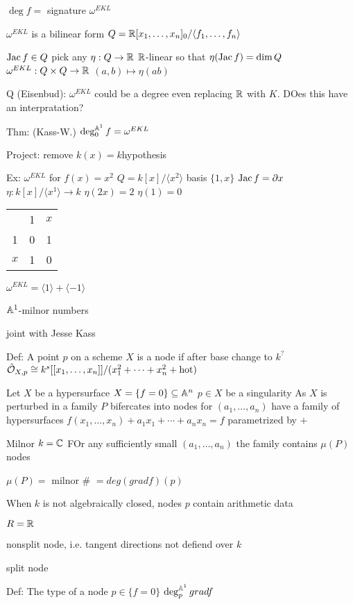 $\deg f=$ signature $\omega^{EKL}$

$\omega^{EKL}$ is a bilinear form
$Q= \mathbb{R}[x_1,\ldots,x_n]_0/\langle f_1,\ldots,f_n \rangle$

$\operatorname{Jac} f \in Q$
pick any $\eta: Q \to \mathbb{R}$
$\mathbb{R}$-linear so that 
$\eta(\operatorname{Jac} f)= \dim Q$
$\omega^{EKL}: Q \times Q \to \mathbb{R}$
$(a,b) \mapsto \eta(ab)$

Q (Eisenbud): $\omega^{EKL}$ could be a degree even replacing $\mathbb{R}$ with $K$. DOes this have an interpratation?

Thm: (Kass-W.)
$\deg_0^{\mathbb{A}^1} f= \omega^{EKL}$

Project: remove $k(x)=k $hypothesis

Ex: $\omega^{EKL}$ for $f(x)=x^2$
$Q= k[x]/\langle x^2 \rangle$ basis $\{1,x\}$
$\operatorname{Jac} f= \partial x$
$\eta: k[x]/\langle x^1 \rangle \to k$
$\eta(2x)=2$
$\eta(1)=0$

\begin{tabular}{ccc}
& 1 & $x$ \\
1 & 0 & 1 \\
$x$ & 1 & 0 
\end{tabular}


$\omega^{EKL}= \langle 1 \rangle + \langle -1 \rangle$ 


$\mathbb{A}^1$-milnor numbers

joint with Jesse Kass

Def: A point $p$ on a scheme $X$ is a node if after base change to $k^?$
$\hat{\mathcal{O}}_{X,p} \cong k^s[[x_1,\ldots,x_n]]/(x_1^2+\cdots+x_n^2+ \text{hot})$

Let $X$ be a hypersurface $X= \{f=0\} \subseteq \mathbb{A}^n$
$p \in X$ be a singularity
As $X$ is perturbed in a family $P$ bifercates into nodes for $(a_1,\ldots,a_n)$ have a family of hypersurfaces $f(x_1,\ldots,x_n) + a_1x_1+\cdots+a_nx_n= f$ parametrized by $+$


Milnor
$k= \mathbb{C}$
FOr any sufficiently small $(a_1,\ldots,a_n)$ the family contains $\mu(P)$ nodes

$\mu(P)=$ milnor \# $= deg (grad f)(p)$

When $k$ is not algebraically closed, nodes $p$ contain arithmetic data

$R= \mathbb{R}$

nonsplit node, i.e. tangent directions not defiend over $k$

split node


Def: The type of a node $p \in \{f=0\}$
$\deg_p^{\mathbb{A}^1} grad f$

